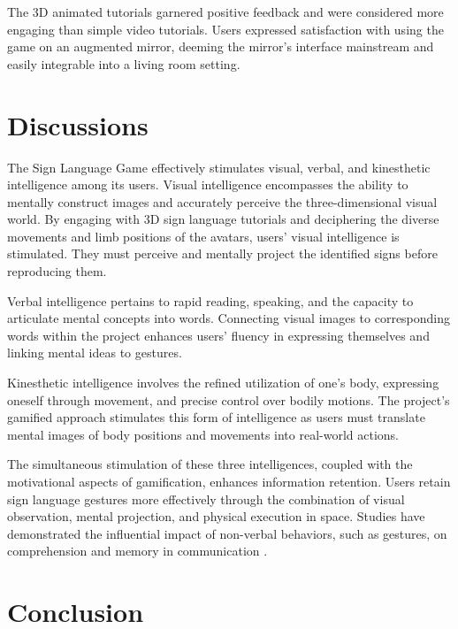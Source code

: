 The 3D animated tutorials garnered positive feedback and were considered more engaging than simple video tutorials. Users expressed satisfaction with using the game on an augmented mirror, deeming the mirror's interface mainstream and easily integrable into a living room setting.



\section{Discussions}

The Sign Language Game effectively stimulates visual, verbal, and kinesthetic intelligence among its users. Visual intelligence encompasses the ability to mentally construct images and accurately perceive the three-dimensional visual world. By engaging with 3D sign language tutorials and deciphering the diverse movements and limb positions of the avatars, users' visual intelligence is stimulated. They must perceive and mentally project the identified signs before reproducing them.

Verbal intelligence pertains to rapid reading, speaking, and the capacity to articulate mental concepts into words. Connecting visual images to corresponding words within the project enhances users' fluency in expressing themselves and linking mental ideas to gestures.

Kinesthetic intelligence involves the refined utilization of one's body, expressing oneself through movement, and precise control over bodily motions. The project's gamified approach stimulates this form of intelligence as users must translate mental images of body positions and movements into real-world actions.

The simultaneous stimulation of these three intelligences, coupled with the motivational aspects of gamification, enhances information retention. Users retain sign language gestures more effectively through the combination of visual observation, mental projection, and physical execution in space. Studies have demonstrated the influential impact of non-verbal behaviors, such as gestures, on comprehension and memory in communication \cite{kelly1999offering}.

\section{Conclusion}

